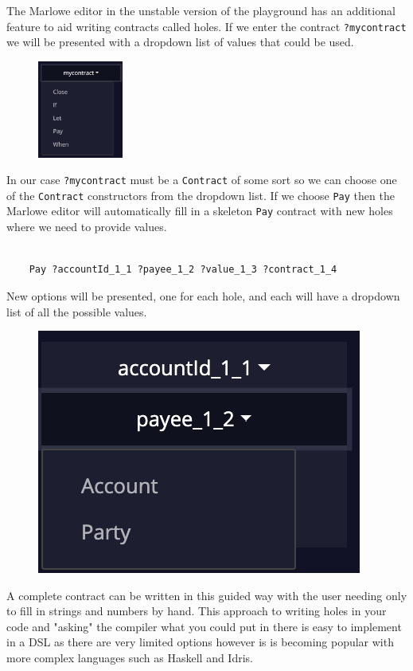 \documentclass[runningheads]{llncs}
\begin{document}
The Marlowe editor in the unstable version of the playground has an additional feature to aid writing contracts called holes. If we enter the contract \lstinline{?mycontract} we will be presented with a dropdown list of values that could be used.

\begin{figure}
    \vspace*{-0.3in}
    \includegraphics[width=0.25\textwidth]{hole_options.png}
\end{figure}
In our case \lstinline{?mycontract} must be a \lstinline{Contract} of some sort so we can choose one of the \lstinline{Contract} constructors from the dropdown list. If we choose \lstinline{Pay} then the Marlowe editor will automatically fill in a skeleton \lstinline{Pay} contract with new holes where we need to provide values.
\\ \\
\begin{verbatim}
    Pay ?accountId_1_1 ?payee_1_2 ?value_1_3 ?contract_1_4
\end{verbatim}
New options will be presented, one for each hole, and each will have a dropdown list of all the possible values.
\begin{figure}
    \vspace*{-0.3in}
    \includegraphics[scale=0.2]{hole_options_2.png}
\end{figure}
A complete contract can be written in this guided way with the user needing only to fill in strings and numbers by hand. This approach to writing holes in your code and "asking" the compiler what you could put in there is easy to implement in a DSL as there are very limited options however is is becoming popular with more complex languages such as Haskell and Idris.
\end{document}
